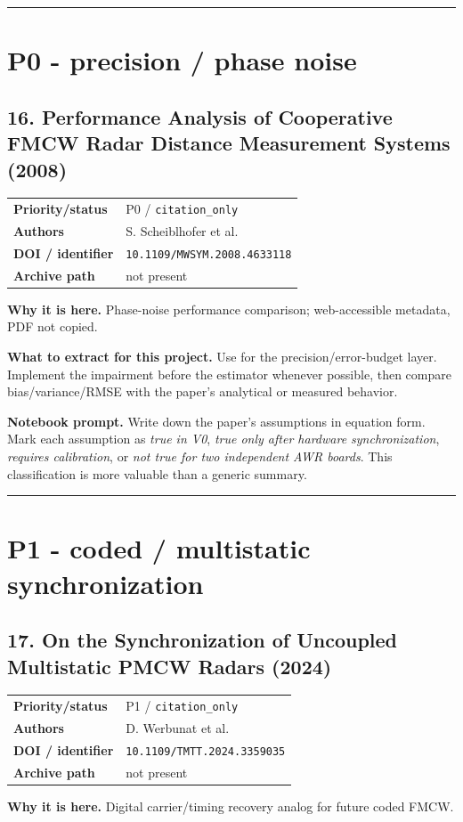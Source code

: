 \documentclass[10.5pt]{article}
\begin{document}
\vspace{0.35em}\hrule\vspace{0.65em}

\clearpage
\section{P0 - precision / phase noise}

\subsection*{16. Performance Analysis of Cooperative FMCW Radar Distance Measurement Systems (2008)}
\begin{tabularx}{\textwidth}{@{}p{}X@{}}
\textbf{Priority/status} & P0 / \nolinkurl{citation_only} \\
\textbf{Authors} & S. Scheiblhofer et al. \\
\textbf{DOI / identifier} & \nolinkurl{10.1109/MWSYM.2008.4633118} \\
\textbf{Archive path} & not present \\
\end{tabularx}
\textbf{Why it is here.} Phase-noise performance comparison; web-accessible metadata, PDF not copied.

\textbf{What to extract for this project.} Use for the precision/error-budget layer. Implement the impairment before the estimator whenever possible, then compare bias/variance/RMSE with the paper's analytical or measured behavior.

\textbf{Notebook prompt.} Write down the paper's assumptions in equation form. Mark each assumption as \emph{true in V0}, \emph{true only after hardware synchronization}, \emph{requires calibration}, or \emph{not true for two independent AWR boards}. This classification is more valuable than a generic summary.

\vspace{0.35em}\hrule\vspace{0.65em}

\clearpage
\section{P1 - coded / multistatic synchronization}

\subsection*{17. On the Synchronization of Uncoupled Multistatic PMCW Radars (2024)}
\begin{tabularx}{\textwidth}{@{}p{}X@{}}
\textbf{Priority/status} & P1 / \nolinkurl{citation_only} \\
\textbf{Authors} & D. Werbunat et al. \\
\textbf{DOI / identifier} & \nolinkurl{10.1109/TMTT.2024.3359035} \\
\textbf{Archive path} & not present \\
\end{tabularx}
\textbf{Why it is here.} Digital carrier/timing recovery analog for future coded FMCW.
\end{document}

